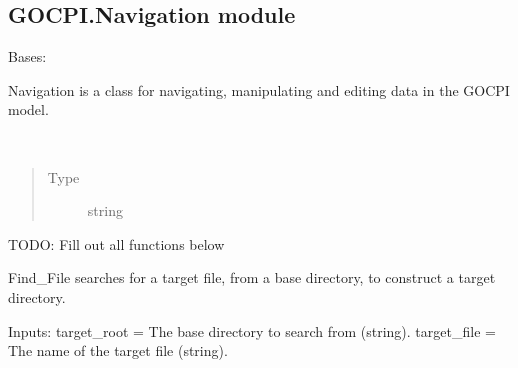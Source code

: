 \documentclass[a4paper,12pt,english]{article}
\begin{document}
\subsection{GOCPI.Navigation module}
\label{\detokenize{GOCPI:module-GOCPI.Navigation}}\label{\detokenize{GOCPI:gocpi-navigation-module}}

\begin{fulllineitems}
\label{\detokenize{GOCPI:GOCPI.Navigation.Navigation}}
Bases: 

Navigation is a class for navigating, manipulating and editing data in the GOCPI model.

\begin{fulllineitems}
\label{\detokenize{GOCPI:GOCPI.Navigation.Navigation.Find_File}}~\begin{quote}\begin{description}
\item[{Type}] \leavevmode
string

\end{description}\end{quote}

\end{fulllineitems}


TODO: Fill out all functions below

\begin{fulllineitems}
\label{\detokenize{GOCPI:id0}}
Find\_File searches for a target file, from a base directory, to construct
a target directory.

Inputs:
target\_root = The base directory to search from (string).
target\_file = The name of the target file (string).


\end{fulllineitems}
\end{fulllineitems}
\end{document}
